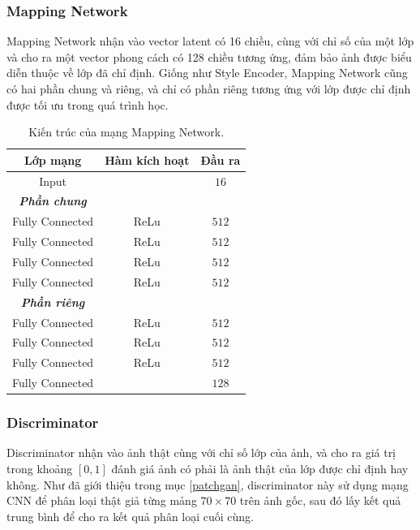 \documentclass[12pt]{extreport}
\begin{document}
\subsubsection{Mapping Network}

Mapping Network nhận vào vector latent có 16 chiều, cùng với chỉ số của một lớp và cho ra một vector phong cách có 128 chiều tương ứng, đảm bảo ảnh được biểu diễn thuộc về lớp đã chỉ định. Giống như Style Encoder, Mapping Network cũng có hai phần chung và riêng, và chỉ có phần riêng tương ứng với lớp được chỉ định được tối ưu trong quá trình học.

\begin{table}[H]
    \centering
    \begin{tabular}{c c c}
        Lớp mạng        & Hàm kích hoạt & Đầu ra  \\
        \hline
        Input           &               & $ 16 $  \\
        \hline
        \textbf{\textit{Phần chung}}              \\
        Fully Connected & ReLu          & $ 512 $ \\
        Fully Connected & ReLu          & $ 512 $ \\
        Fully Connected & ReLu          & $ 512 $ \\
        Fully Connected & ReLu          & $ 512 $ \\
        \hline
        \textbf{\textit{Phần riêng}}              \\
        Fully Connected & ReLu          & $ 512 $ \\
        Fully Connected & ReLu          & $ 512 $ \\
        Fully Connected & ReLu          & $ 512 $ \\
        Fully Connected &               & $ 128 $
    \end{tabular}
    \caption{Kiến trúc của mạng Mapping Network.}
\end{table}

\subsubsection{Discriminator}

Discriminator nhận vào ảnh thật cùng với chỉ số lớp của ảnh, và cho ra giá trị trong khoảng $ [0, 1] $ đánh giá ảnh có phải là ảnh thật của lớp được chỉ định hay không. Như đã giới thiệu trong mục \ref{patchgan}, discriminator này sử dụng mạng CNN để phân loại thật giả từng mảng $ 70 \times 70 $ trên ảnh gốc, sau đó lấy kết quả trung bình để cho ra kết quả phân loại cuối cùng.
\end{document}
